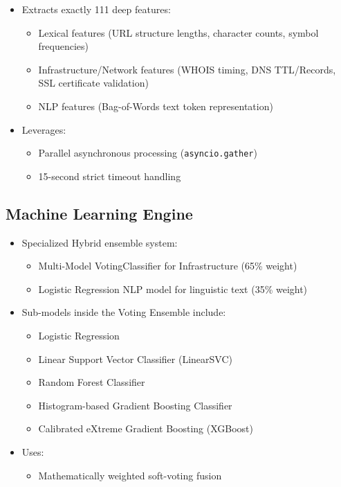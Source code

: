 \begin{itemize}
    \item Extracts exactly 111 deep features:
    \begin{itemize}
        \item Lexical features (URL structure lengths, character counts, symbol frequencies)
        \item Infrastructure/Network features (WHOIS timing, DNS TTL/Records, SSL certificate validation)
        \item NLP features (Bag-of-Words text token representation)
    \end{itemize}
    \item Leverages:
    \begin{itemize}
        \item Parallel asynchronous processing (\texttt{asyncio.gather})
        \item 15-second strict timeout handling
    \end{itemize}
\end{itemize}

\subsection{Machine Learning Engine}

\begin{itemize}
    \item Specialized Hybrid ensemble system:
    \begin{itemize}
        \item Multi-Model VotingClassifier for Infrastructure (65\% weight)
        \item Logistic Regression NLP model for linguistic text (35\% weight)
    \end{itemize}
    \item Sub-models inside the Voting Ensemble include:
    \begin{itemize}
        \item Logistic Regression
        \item Linear Support Vector Classifier (LinearSVC)
        \item Random Forest Classifier
        \item Histogram-based Gradient Boosting Classifier
        \item Calibrated eXtreme Gradient Boosting (XGBoost) \cite{ref12}
    \end{itemize}
    \item Uses:
    \begin{itemize}
        \item Mathematically weighted soft-voting fusion
    \end{itemize}
\end{itemize}

